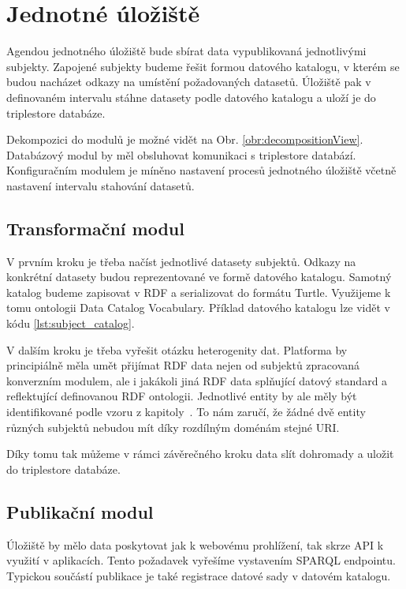 \section{Jednotné úložiště}

Agendou jednotného úložiště bude sbírat data vypublikovaná jednotlivými subjekty. Zapojené subjekty budeme řešit formou datového katalogu, v kterém se budou nacházet odkazy na umístění požadovaných datasetů. Úložiště pak v definovaném intervalu stáhne datasety podle datového katalogu a uloží je do triplestore databáze.

Dekompozici do modulů je možné vidět na Obr. \ref{obr:decompositionView}. Databázový modul by měl obsluhovat komunikaci s triplestore databází. Konfiguračním modulem je míněno nastavení procesů jednotného úložiště včetně nastavení intervalu stahování datasetů.

\subsection*{Transformační modul}

V prvním kroku je třeba načíst jednotlivé datasety subjektů. Odkazy na konkrétní datasety budou reprezentované ve formě datového katalogu. Samotný katalog budeme zapisovat v RDF a serializovat do formátu Turtle. Využijeme k tomu ontologii Data Catalog Vocabulary. Příklad datového katalogu lze vidět v kódu \ref{lst:subject_catalog}.

V dalším kroku je třeba vyřešit otázku heterogenity dat. Platforma by principiálně měla umět přijímat RDF data nejen od subjektů zpracovaná konverzním modulem, ale i jakákoli jiná RDF data splňující datový standard a reflektující definovanou RDF ontologii. Jednotlivé entity by ale měly být identifikované podle vzoru z kapitoly~. To nám zaručí, že žádné dvě entity různých subjektů nebudou mít díky rozdílným doménám stejné URI. 

Díky tomu tak můžeme v rámci závěrečného kroku data slít dohromady a uložit do triplestore databáze.



\subsection*{Publikační modul}

Úložiště by mělo data poskytovat jak k webovému prohlížení, tak skrze API k využití v aplikacích. Tento požadavek vyřešíme vystavením SPARQL endpointu. Typickou součástí publikace je také registrace datové sady v datovém katalogu.

